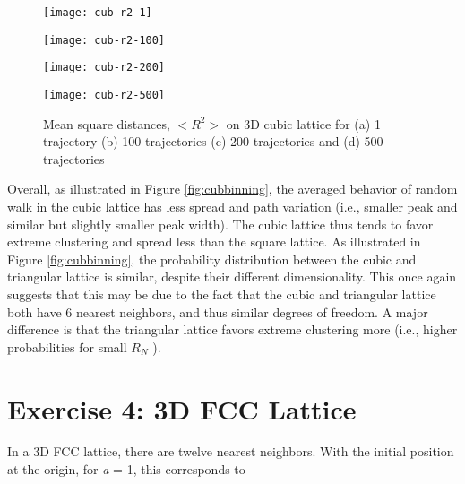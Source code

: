 \documentclass[12pt, oneside]{article}
\begin{document}
\begin{figure}
\begin{minipage}[htbp]{.49\linewidth}
\centering
\texttt{[image: cub-r2-1]}
\end{minipage}
\begin{minipage}[htbp]{.49\linewidth}
\centering
\texttt{[image: cub-r2-100]}
\end{minipage}
\begin{minipage}[htbp]{.49\linewidth}
\centering
\texttt{[image: cub-r2-200]}
\end{minipage}
\begin{minipage}[htbp]{.49\linewidth}
\centering
\texttt{[image: cub-r2-500]}
\end{minipage}
\caption{Mean square distances, $<R^{2}>$ on 3D cubic lattice for (a) 1 trajectory (b) 100 trajectories (c) 200 trajectories and (d) 500 trajectories}
\label{fig:cubr2}
\end{figure}

Overall, as illustrated in Figure \ref{fig:cubbinning}, the averaged behavior of random walk in the cubic lattice has less spread and path variation (i.e., smaller peak and similar but slightly smaller peak width). The cubic lattice thus tends to favor extreme clustering and spread less than the square lattice. As illustrated in Figure \ref{fig:cubbinning}, the probability distribution between the cubic and triangular lattice is similar, despite their different dimensionality. This once again suggests that this may be due to the fact that the cubic and triangular lattice both have 6 nearest neighbors, and thus similar degrees of freedom. A major difference is that the triangular lattice favors extreme clustering more (i.e., higher probabilities for small $R_{N}$ ).

\section{Exercise 4: 3D FCC Lattice}

In a 3D FCC lattice, there are twelve nearest neighbors. With the initial position at the origin, for \textit{a} = 1, this corresponds to
\end{document}
